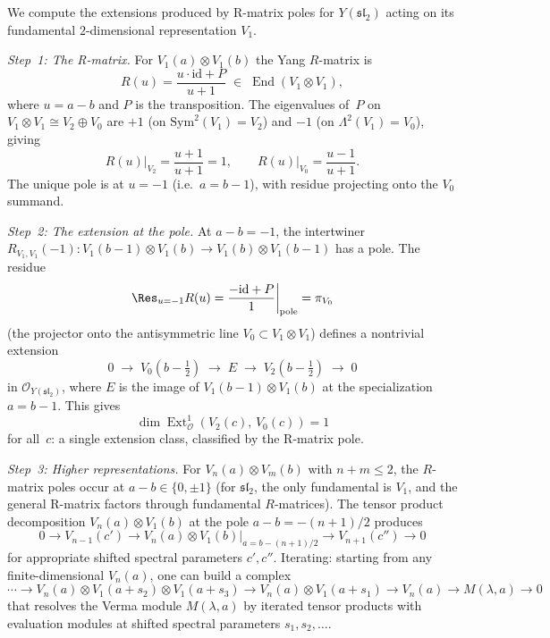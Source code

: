 \begin{computation}
\label{comp:sl2-rmatrix-ext}
We compute the extensions produced by R-matrix poles for
$Y(\mathfrak{sl}_2)$ acting on its fundamental
$2$-dimensional representation $V_1$.

\emph{Step~1: The R-matrix.}
For $V_1(a) \otimes V_1(b)$ the Yang $R$-matrix is
\begin{equation}\label{eq:sl2-rmatrix-fundamental}
R(u) = \frac{u \cdot \mathrm{id} + P}{u + 1}
\;\in\; \operatorname{End}(V_1 \otimes V_1),
\end{equation}
where $u = a - b$ and $P$ is the transposition.
The eigenvalues of~$P$ on $V_1 \otimes V_1 \cong V_2 \oplus V_0$
are $+1$ (on $\mathrm{Sym}^2(V_1) = V_2$) and $-1$
(on $\Lambda^2(V_1) = V_0$), giving
\[
R(u)\big|_{V_2} = \frac{u+1}{u+1} = 1, \qquad
R(u)\big|_{V_0} = \frac{u-1}{u+1}.
\]
The unique pole is at $u = -1$ (i.e.\ $a = b - 1$), with residue
projecting onto the $V_0$ summand.

\emph{Step~2: The extension at the pole.}
At $a - b = -1$, the intertwiner
$R_{V_1,V_1}(-1)\colon V_1(b-1) \otimes V_1(b) \to
V_1(b) \otimes V_1(b-1)$
has a pole.  The residue
\[
\Res_{u = -1} R(u) = \frac{-\mathrm{id} + P}{1}
\bigg|_{\text{pole}} = \pi_{V_0}
\]
(the projector onto the antisymmetric line $V_0 \subset
V_1 \otimes V_1$) defines a nontrivial extension
\begin{equation}\label{eq:sl2-ext-fundamental}
0 \;\to\; V_0(b-\tfrac{1}{2})
\;\to\; E
\;\to\; V_2(b-\tfrac{1}{2})
\;\to\; 0
\end{equation}
in $\mathcal{O}_{Y(\mathfrak{sl}_2)}$, where $E$ is the image
of $V_1(b-1) \otimes V_1(b)$ at the specialization $a = b - 1$.
This gives
\begin{equation}\label{eq:sl2-ext1}
\dim \operatorname{Ext}^1_{\mathcal{O}}(V_2(c),\, V_0(c)) = 1
\end{equation}
for all~$c$: a single extension class, classified by the
R-matrix pole.

\emph{Step~3: Higher representations.}
For $V_n(a) \otimes V_m(b)$ with $n + m \le 2$, the
$R$-matrix poles occur at $a - b \in \{0, \pm 1\}$ (for
$\mathfrak{sl}_2$, the only fundamental is $V_1$, and the
general R-matrix factors through fundamental $R$-matrices).
The tensor product decomposition
$V_n(a) \otimes V_1(b)$ at the pole $a - b = -(n+1)/2$
produces
\[
0 \to V_{n-1}(c') \to V_n(a) \otimes V_1(b)\big|_{a = b - (n+1)/2}
\to V_{n+1}(c'') \to 0
\]
for appropriate shifted spectral parameters $c', c''$.
Iterating: starting from any finite-dimensional $V_n(a)$,
one can build a complex
\[
\cdots \to V_n(a) \otimes V_1(a+s_2) \otimes V_1(a+s_3)
\to V_n(a) \otimes V_1(a+s_1) \to V_n(a) \to M(\lambda, a) \to 0
\]
that resolves the Verma module $M(\lambda, a)$ by iterated tensor
products with evaluation modules at shifted spectral parameters
$s_1, s_2, \ldots$.


\end{computation}
